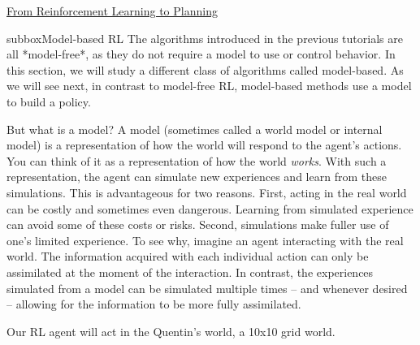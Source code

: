 \begin{textbox}{\href{https://compneuro.neuromatch.io/tutorials/W3D4_ReinforcementLearning/student/W3D4_Tutorial4.html}{From Reinforcement Learning to Planning } }

\begin{subbox}{subbox}{Model-based RL}
\scriptsize
The algorithms introduced in the previous tutorials are all *model-free*, as they do not require a model to use or control behavior. In this section, we will study a different class of algorithms called model-based. As we will see next, in contrast to model-free RL, model-based methods use a model to build a policy.

But what is a model? A model (sometimes called a world model or internal model) is a representation of how the world will respond to the agent's actions. You can think of it as a representation of how the world \textit{works}. With such a representation, the agent can simulate new experiences and learn from these simulations. This is advantageous for two reasons. First, acting in the real world can be costly and sometimes even dangerous. Learning from simulated experience can avoid some of these costs or risks. Second, simulations make fuller use of one's limited experience. To see why, imagine an agent interacting with the real world. The information acquired with each individual action can only be assimilated at the moment of the interaction. In contrast, the experiences simulated from a model can be simulated multiple times -- and whenever desired -- allowing for the information to be more fully assimilated.

Our RL agent will act in the Quentin's world, a 10x10 grid world. 
\begin{center}
    

\end{center}
\end{subbox}
\end{textbox}
